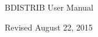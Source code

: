 \begin{center}

\vspace*{2in}

{\Huge BDISTRIB User Manual}

\vspace{4in}


\vspace{0.5in}

Revised August 22, 2015

\end{center}

